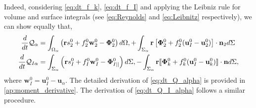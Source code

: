 Indeed, considering \ref{eq:dt_f_k}, \ref{eq:dt_f_I} and applying the Leibniz rule for volume and surface integrals (see \ref{eq:Reynolds} and \ref{eq:Leibnitz} respectively), we can show equally that,
\begin{align}
    \frac{d}{d t} {\mathcal{Q}_\alpha}
    &= \int_{\Omega_\alpha}  \left(
        \textbf{r} s_2^0         
        + f_2^0  \textbf{w}_2^0 
        - \mathbf{\Phi}_2^0
    \right)  d\Omega,
    + \int_{\Sigma_\alpha}  \textbf{r} \left[
        \mathbf{\Phi}_2^0
        + f_2^0 (\textbf{u}_I^0-\textbf{u}_2^0)
    \right]\cdot \textbf{n}_2   d\Sigma 
    \label{eq:dt_Q_alpha}\\
    \frac{d}{d t} {\mathcal{Q}_{I\alpha}}
    &= \int_{\Sigma_\alpha}  \left(
        \textbf{r}s_I^0
        + f_I^0 \textbf{w}_I^0
        - \mathbf{\Phi}_{I||}^0
    \right)  d\Sigma,
    - \int_{\Sigma_\alpha} \textbf{r} 
    \llbracket \mathbf{\Phi}_k^0
        + f_k^0 (\textbf{u}_I^0 - \textbf{u}_k^0)
     \rrbracket \cdot \textbf{n}
     d\Sigma,
    \label{eq:dt_Q_I_alpha}
\end{align}
where $\textbf{w}_I^0 = \textbf{u}_I^0 - \textbf{u}_\alpha$.
The detailed derivation of \ref{eq:dt_Q_alpha} is provided in \ref{ap:moment_derivative}.
The derivation of \ref{eq:dt_Q_I_alpha} follows a similar procedure. 
